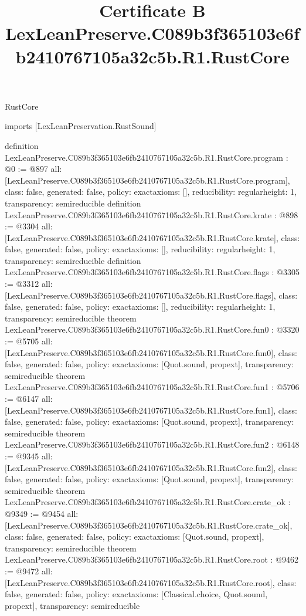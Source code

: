 \begin{lexlean}{RustCore}
\title{Certificate B LexLeanPreserve.C089b3f365103e6fb2410767105a32c5b.R1.RustCore}
\begin{coremodule}
imports [LexLeanPreservation.RustSound]

definition LexLeanPreserve.C089b3f365103e6fb2410767105a32c5b.R1.RustCore.program : @0 := @897 {
  all: [LexLeanPreserve.C089b3f365103e6fb2410767105a32c5b.R1.RustCore.program],
  class: false,
  generated: false,
  policy: exact{axioms: []},
  reducibility: regular{height: 1},
  transparency: semireducible
}
definition LexLeanPreserve.C089b3f365103e6fb2410767105a32c5b.R1.RustCore.krate : @898 := @3304 {
  all: [LexLeanPreserve.C089b3f365103e6fb2410767105a32c5b.R1.RustCore.krate],
  class: false,
  generated: false,
  policy: exact{axioms: []},
  reducibility: regular{height: 1},
  transparency: semireducible
}
definition LexLeanPreserve.C089b3f365103e6fb2410767105a32c5b.R1.RustCore.flags : @3305 := @3312 {
  all: [LexLeanPreserve.C089b3f365103e6fb2410767105a32c5b.R1.RustCore.flags],
  class: false,
  generated: false,
  policy: exact{axioms: []},
  reducibility: regular{height: 1},
  transparency: semireducible
}
theorem LexLeanPreserve.C089b3f365103e6fb2410767105a32c5b.R1.RustCore.fun0 : @3320 := @5705 {
  all: [LexLeanPreserve.C089b3f365103e6fb2410767105a32c5b.R1.RustCore.fun0],
  class: false,
  generated: false,
  policy: exact{axioms: [Quot.sound, propext]},
  transparency: semireducible
}
theorem LexLeanPreserve.C089b3f365103e6fb2410767105a32c5b.R1.RustCore.fun1 : @5706 := @6147 {
  all: [LexLeanPreserve.C089b3f365103e6fb2410767105a32c5b.R1.RustCore.fun1],
  class: false,
  generated: false,
  policy: exact{axioms: [Quot.sound, propext]},
  transparency: semireducible
}
theorem LexLeanPreserve.C089b3f365103e6fb2410767105a32c5b.R1.RustCore.fun2 : @6148 := @9345 {
  all: [LexLeanPreserve.C089b3f365103e6fb2410767105a32c5b.R1.RustCore.fun2],
  class: false,
  generated: false,
  policy: exact{axioms: [Quot.sound, propext]},
  transparency: semireducible
}
theorem LexLeanPreserve.C089b3f365103e6fb2410767105a32c5b.R1.RustCore.crate_ok : @9349 := @9454 {
  all: [LexLeanPreserve.C089b3f365103e6fb2410767105a32c5b.R1.RustCore.crate_ok],
  class: false,
  generated: false,
  policy: exact{axioms: [Quot.sound, propext]},
  transparency: semireducible
}
theorem LexLeanPreserve.C089b3f365103e6fb2410767105a32c5b.R1.RustCore.root : @9462 := @9472 {
  all: [LexLeanPreserve.C089b3f365103e6fb2410767105a32c5b.R1.RustCore.root],
  class: false,
  generated: false,
  policy: exact{axioms: [Classical.choice, Quot.sound, propext]},
  transparency: semireducible
}


\end{coremodule}
\end{lexlean}
